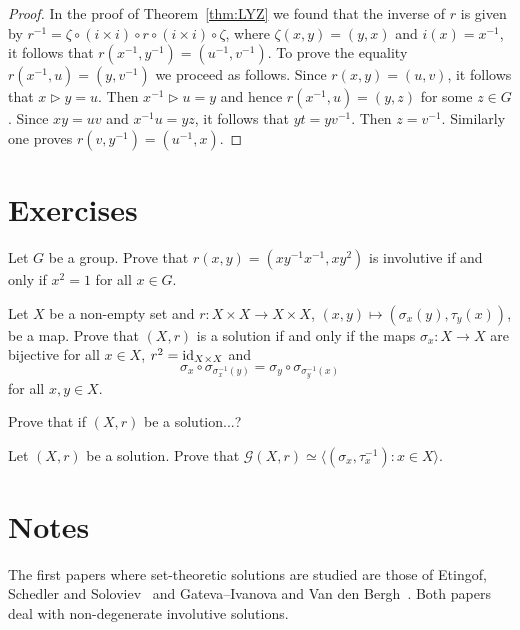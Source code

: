 \begin{proof}
In the proof of Theorem~\ref{thm:LYZ} we found that 
the inverse of $r$ is given by $r^{-1}=\zeta\circ (i\times i)\circ r\circ (i\times i)\circ \zeta$,
where $\zeta(x,y)=(y,x)$ and $i(x)=x^{-1}$, it follows that $r(x^{-1},y^{-1})=(u^{-1},v^{-1})$.  
To prove the equality $r(x^{-1},u)=(y,v^{-1})$ we proceed as follows. Since $r(x,y)=(u,v)$, it 
follows that $x\triangleright y=u$. Then $x^{-1}\triangleright u=y$ and
hence $r(x^{-1},u)=(y,z)$ for some $z\in G$. 
Since $xy=uv$ and $x^{-1}u=yz$, it follows that $yt=yv^{-1}$. Then 
$z=v^{-1}$. Similarly one proves $r(v,y^{-1})=(u^{-1},x).$
\end{proof}

\section*{Exercises}

\begin{prob}
\label{prob:Wada}
Let $G$ be a group. Prove that $r(x,y)=(xy^{-1}x^{-1},xy^2)$ 
is involutive if and only if $x^2=1$ for all $x\in G$. 
\end{prob}

\begin{prob}
Let $X$ be a  non-empty set and $r\colon X\times X\to X\times X$, $(x,y)\mapsto (\sigma_x(y),\tau_y(x))$, be a map.
Prove that $(X,r)$ is a solution if and only if 
the maps $\sigma_x\colon X\to X$ are bijective for all $x\in X$,
$r^2=\operatorname{id}_{X\times X}$ and 
\[
\sigma_x\circ\sigma_{\sigma^{-1}_x(y)}=\sigma_y\circ\sigma_{\sigma^{-1}_y(x)}
\]
for all $x,y\in X$. 
\end{prob}


\begin{prob}
Prove that if $(X,r)$ be a solution...? 
\end{prob}

\begin{prob}
\label{prob:perm_group}
Let $(X,r)$ be a solution. Prove that $\mathcal{G}(X,r)\simeq\langle (\sigma_x,\tau^{-1}_x):x\in X\rangle$. 
\end{prob}


\section*{Notes}

The first papers where set-theoretic solutions are studied are those of Etingof, Schedler and Soloviev~\cite{MR1722951} 
and Gateva--Ivanova and Van den Bergh~\cite{MR1637256}. 
Both papers deal with non-degenerate involutive solutions. 

